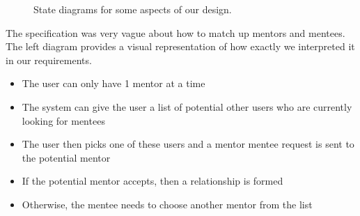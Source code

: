\documentclass[10pt]{article}
\begin{document}
\begin{figure}[H]
    \centering
    \qquad
    \caption{State diagrams for some aspects of our design.}
    \label{fig:state_diagrams}
\end{figure}

The specification was very vague about how to match up mentors and mentees. The
left diagram provides a visual representation of how exactly we interpreted it
in our requirements.
\begin{itemize}[leftmargin=1.2cm,noitemsep,align=left]
    \item The user can only have 1 mentor at a time
    \item The system can give the user a list of potential other users who are currently looking for mentees
    \item The user then picks one of these users and a mentor mentee request is sent to the potential mentor
    \item If the potential mentor accepts, then a relationship is formed
    \item Otherwise, the mentee needs to choose another mentor from the list
\end{itemize}
\end{document}
